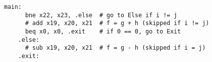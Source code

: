 \documentclass[varwidth, convert]{standalone}
\begin{document}
\begin{BVerbatim}[gobble=4]
    main:
      bne x22, x23, .else  # go to Else if i != j
      # add x19, x20, x21  # f = g + h (skipped if i != j)
      beq x0, x0, .exit    # if 0 == 0, go to Exit
    .else:
      # sub x19, x20, x21  # f = g - h (skipped if i = j)
    .exit:
  \end{BVerbatim}
\end{document}

